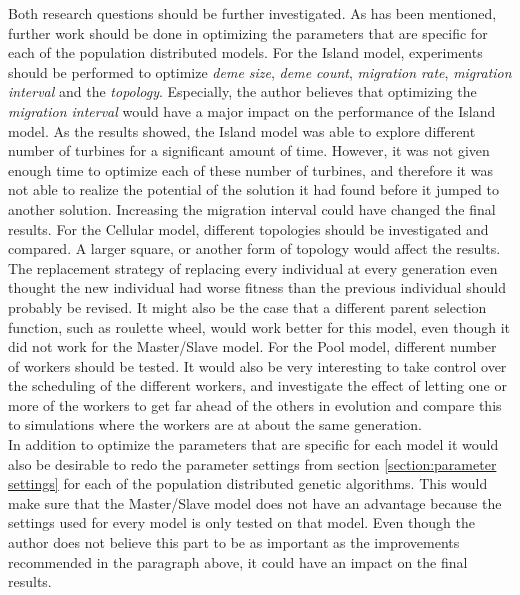 \noindent Both research questions should be further investigated. As has been mentioned, further work should be done in optimizing the parameters that are specific for each of the population distributed models. For the Island model, experiments should be performed to optimize \textit{deme size}, \textit{deme count}, \textit{migration rate}, \textit{migration interval} and the \textit{topology}. Especially, the author believes that optimizing the \textit{migration interval} would have a major impact on the performance of the Island model. As the results showed, the Island model was able to explore different number of turbines for a significant amount of time. However, it was not given enough time to optimize each of these number of turbines, and therefore it was not able to realize the potential of the solution it had found before it jumped to another solution. Increasing the migration interval could have changed the final results. For the Cellular model, different topologies should be investigated and compared. A larger square, or another form of topology would affect the results. The replacement strategy of replacing every individual at every generation even thought the new individual had worse fitness than the previous individual should probably be revised. It might also be the case that a different parent selection function, such as roulette wheel, would work better for this model, even though it did not work for the Master/Slave model. For the Pool model, different number of workers should be tested. It would also be very interesting to take control over the scheduling of the different workers, and investigate the effect of letting one or more of the workers to get far ahead of the others in evolution and compare this to simulations where the workers are at about the same generation. \\


\noindent In addition to optimize the parameters that are specific for each model it would also be desirable to redo the parameter settings from section \ref{section:parameter settings} for each of the population distributed genetic algorithms. This would make sure that the Master/Slave model does not have an advantage because the settings used for every model is only tested on that model. Even though the author does not believe this part to be as important as the improvements  recommended in the paragraph above, it could have an impact on the final results. \\


